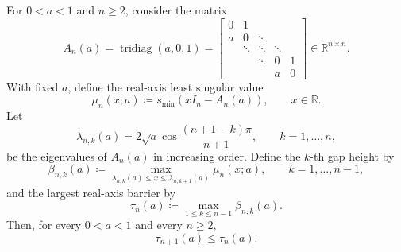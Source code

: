 \documentclass[11pt]{article}
\title{}
\author{}
\date{}
\begin{document}
\maketitle

For \(0<a<1\) and \(n\ge2\), consider the matrix
\[
A_n(a)
=
\operatorname{tridiag}(a,0,1)
=
\begin{bmatrix}
0 & 1 \\
a & 0 & \ddots \\
& \ddots & \ddots & \ddots \\
&& \ddots & 0 & 1 \\
&&& a & 0
\end{bmatrix}\in \mathbb{R}^{n\times n}.
\]
With fixed \(a\), define the real-axis least singular value
\[
\mu_n(x;a)\coloneqq s_{\min}(xI_n-A_n(a)),
\qquad x\in\mathbb{R}.
\]
Let
\[
\lambda_{n,k}(a)
=
2\sqrt a\cos\frac{(n+1-k)\pi}{n+1},
\qquad k=1,\dots,n,
\]
be the eigenvalues of \(A_n(a)\) in increasing order.
Define the \(k\)-th gap height by
\[
\beta_{n,k}(a)
\coloneqq
\max_{\lambda_{n,k}(a)\le x\le\lambda_{n,k+1}(a)}
\mu_n(x;a),
\qquad k=1,\dots,n-1,
\]
and the largest real-axis barrier by
\[
\tau_n(a)\coloneqq\max_{1\le k\le n-1}\beta_{n,k}(a).
\]
Then, for every \(0<a<1\) and every \(n\ge2\),
\[
\tau_{n+1}(a)\le\tau_n(a).
\]
\end{document}
